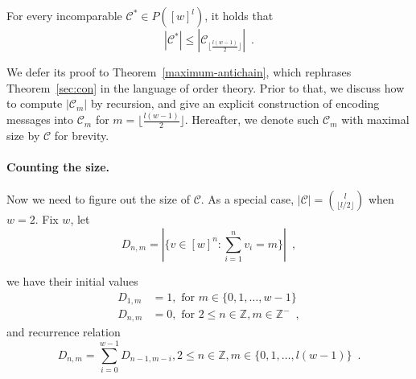 \begin{theorem}\label{sec:con}
For every incomparable $\mathcal{C^*}\in P([w]^l)$, it holds that 
\[
 |\mathcal{C^*}| \leq |\mathcal{C}_{\lfloor\frac{l(w-1)}{2}\rfloor}|\enspace.
\]
\end{theorem}
We defer its proof to Theorem~\ref{maximum-antichain}, which rephrases
Theorem~\ref{sec:con}  in the language of order theory. Prior to that, we discuss how to compute  $|\mathcal{C}_m|$ by recursion, and give an explicit construction of 
encoding messages into $\mathcal{C}_{m}$ for $m=\lfloor\frac{l(w-1)}{2}\rfloor$. Hereafter, we denote such $\mathcal{C}_{m}$ with maximal size by $\mathcal{C}$ for brevity. 






\paragraph{Counting the size.} Now we need to figure out the size of $\mathcal{C}$. As a special case, $|\mathcal{C}|=\binom{l}{\lfloor l/2 \rfloor}$ when $w=2$. Fix $w$, let
$$ D_{n,m}= |\{v\in [w]^n : \sum_{i=1}^{n} v_i = m \}| \enspace , $$

we have their initial values
\begin{align*}
D_{1,m} &= 1 , \mbox{ for }m\in \{0,1,\dots,w-1\} \\
D_{n,m} &= 0 , \mbox{ for }2\leq n \in \mathbb{Z}, m \in \mathbb{Z^-} \enspace ,
\end{align*}
and recurrence relation
\begin{equation} \label{equ:recurrence}
    D_{n,m} = \sum_{i=0}^{w-1} D_{n-1,m-i} , 2 \leq n \in \mathbb{Z},m\in \{0,1,\dots,l(w-1)\} \enspace . 
\end{equation}

